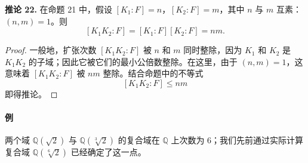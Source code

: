 \noindent\textbf{推论 22.} 在命题 21 中，假设 $[K_1:F]=n$，$[K_2:F]=m$，其中 $n$ 与 $m$ 互素：$(n,m)=1$。则
\[
[K_1K_2:F]=[K_1:F][K_2:F]=nm.
\]

\begin{proof}
	一般地，扩张次数 $[K_1K_2:F]$ 被 $n$ 和 $m$ 同时整除，因为 $K_1$ 和 $K_2$ 是 $K_1K_2$ 的子域；因此它被它们的最小公倍数整除。在这里，由于 $(n,m)=1$，这意味着 $[K_1K_2:F]$ 被 $nm$ 整除。结合命题中的不等式
	\[
	[K_1K_2:F]\leq nm
	\]
	即得推论。
\end{proof}

\paragraph{例}
两个域 $\mathbb Q(\sqrt2)$ 与 $\mathbb Q(\sqrt[3]{2})$ 的复合域在 $\mathbb Q$ 上次数为 $6$；我们先前通过实际计算复合域 $\mathbb Q(\sqrt[6]{2})$ 已经确定了这一点。

